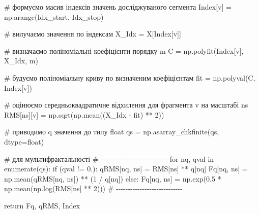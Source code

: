 \documentclass[
  letterpaper,
]{report}
\newenvironment{Shaded}{\begin{snugshade}}{\end{snugshade}}
\newcommand{\BuiltInTok}[1]{\textcolor[rgb]{0.00,0.23,0.31}{#1}}
\newcommand{\CommentTok}[1]{\textcolor[rgb]{0.37,0.37,0.37}{#1}}
\newcommand{\ControlFlowTok}[1]{\textcolor[rgb]{0.00,0.23,0.31}{#1}}
\newcommand{\DecValTok}[1]{\textcolor[rgb]{0.68,0.00,0.00}{#1}}
\newcommand{\FloatTok}[1]{\textcolor[rgb]{0.68,0.00,0.00}{#1}}
\newcommand{\KeywordTok}[1]{\textcolor[rgb]{0.00,0.23,0.31}{#1}}
\newcommand{\NormalTok}[1]{\textcolor[rgb]{0.00,0.23,0.31}{#1}}
\newcommand{\OperatorTok}[1]{\textcolor[rgb]{0.37,0.37,0.37}{#1}}
\begin{document}
\begin{Shaded}
\begin{Highlighting}[]
            \CommentTok{\# формуємо масив індексів значень досліджуваного сегмента}
\NormalTok{            Index[v] }\OperatorTok{=}\NormalTok{ np.arange(Idx\_start, Idx\_stop)  }

            \CommentTok{\# вилучаємо значення по індексам}
\NormalTok{            X\_Idx }\OperatorTok{=}\NormalTok{ X[Index[v]]                       }

            \CommentTok{\# визначаємо поліноміальні коефіцієнти порядку m}
\NormalTok{            C }\OperatorTok{=}\NormalTok{ np.polyfit(Index[v], X\_Idx, m) }
            
            \CommentTok{\# будуємо поліноміальну криву по визначеним коефіцієнтам}
\NormalTok{            fit }\OperatorTok{=}\NormalTok{ np.polyval(C, Index[v])  }

            \CommentTok{\# оцінюємо середньоквадратичне відхилення для фрагмента v на масштабі ns }
\NormalTok{            RMS[ns][v] }\OperatorTok{=}\NormalTok{ np.sqrt(np.mean((X\_Idx }\OperatorTok{{-}}\NormalTok{ fit) }\OperatorTok{**} \DecValTok{2}\NormalTok{)) }
        
        \CommentTok{\# приводимо q значення до типу float}
\NormalTok{        qs }\OperatorTok{=}\NormalTok{ np.asarray\_chkfinite(qs, dtype}\OperatorTok{=}\BuiltInTok{float}\NormalTok{)}

        \CommentTok{\# для мультифрактальності}
        \CommentTok{\# {-}{-}{-}{-}{-}{-}{-}{-}{-}{-}{-}{-}{-}{-}{-}{-}{-}{-}{-}{-}{-}{-}{-}{-}{-}{-}{-}{-}}
        \ControlFlowTok{for}\NormalTok{ nq, qval }\KeywordTok{in} \BuiltInTok{enumerate}\NormalTok{(qs):}
            \ControlFlowTok{if}\NormalTok{ (qval }\OperatorTok{!=} \FloatTok{0.}\NormalTok{): }
\NormalTok{                qRMS[nq, ns] }\OperatorTok{=}\NormalTok{ RMS[ns] }\OperatorTok{**}\NormalTok{ q[nq]}
\NormalTok{                Fq[nq, ns] }\OperatorTok{=}\NormalTok{ np.mean(qRMS[nq, ns]) }\OperatorTok{**}\NormalTok{ (}\DecValTok{1} \OperatorTok{/}\NormalTok{ q[nq])}
            \ControlFlowTok{else}\NormalTok{:}
\NormalTok{                Fq[nq, ns] }\OperatorTok{=}\NormalTok{ np.exp(}\FloatTok{0.5} \OperatorTok{*}\NormalTok{ np.mean(np.log(RMS[ns] }\OperatorTok{**} \DecValTok{2}\NormalTok{)))}
        \CommentTok{\# {-}{-}{-}{-}{-}{-}{-}{-}{-}{-}{-}{-}{-}{-}{-}{-}{-}{-}{-}{-}{-}{-}{-}{-}{-}{-}{-}{-}}

    \ControlFlowTok{return}\NormalTok{ Fq, qRMS, Index}
\end{Highlighting}
\end{Shaded}
\end{document}
